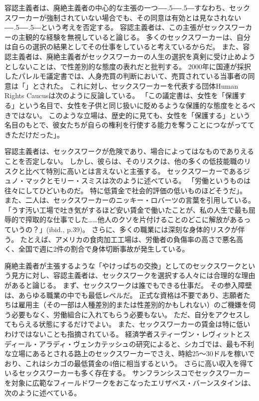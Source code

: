 \documentclass[paper=a4,book,openany]{jlreq}
\newcommand{\ig}[1]{}           %
\def\DDASH{―\kern-.5\zw―\kern-.5\zw―}
\begin{document}
容認主義者は、廃絶主義者の中心的な主張の一つ{\DDASH}すなわち、セックスワーカーが強制されていない場合でも、その同意は有効とは見なされない{\DDASH}という考えを否定する。
容認主義者は、この主張がセックスワーカーの主観的な経験を無視していると論じる。
多くのセックスワーカーは、自分は自らの選択の結果としてその仕事をしていると考えているからだ。
また、容認主義者は、廃絶主義者がセックスワーカーの人生の選択を真剣に受け止めようとしないことは、で性差別的な態度の表れだと批判する。
2000年に国連が採択したパレルモ議定書では、人身売買の判断において、売買されている当事者の同意は「」とされた。
これに対し、セックスワーカーを代表する団体Human Rights Caucusは次のように反論している。
「この議定書は、女性を「保護する」という名目で、女性を子供と同じ扱いに貶めるような保護的な態度をとるべきではない。
このような立場は、歴史的に見ても、女性を「保護する」という名目のもとで、彼女たちが自らの権利を行使する能力を奪うことにつながっててきただけだった」\citep{caucus99:_recom_commen_draft_protoc_combat}。

容認主義者は、セックスワークが危険であり、場合によってはなものでありえることを否定しない。
しかし、彼らは、そのリスクは、他の多くの低技能職のリスクと比べて特別に高いとは言えないと主張する。
セックスワーカーであるジュノ・マックとモリー・スミスは次のように述べている。
「労働というものは往々にしてひどいものだ。
特に低賃金で社会的評価の低いものほどそうだ」\citep[p.43]{mac18:_revol_prost}。
また、二人は、セックスワーカーのニッキー・ロバーツ\ig{Nickie Roberts}の言葉を引用している。
「うす汚い工場で吐き気がするほど安い賃金で働いたことが、私の人生で最も屈辱的で搾取的な仕事でした……他人のクソを片付けることのどこに解放があるっていうの？」(ibid., p.39)。
さらに、多くの職業には深刻な身体的リスクが伴う。
たとえば、アメリカの食肉加工工場は、労働者の負傷率の高さで悪名高く、全国で週に2件の割合で身体切断事故が発生している\citep{wasley18:_two_amput_week}。

廃絶主義者が主張するような「やけっぱちの交換」としてのセックスワークという見方に対し、容認主義者は、セックスワークを選択する人々には合理的な理由があると論じる。
まず、セックスワークは誰でもできる仕事だ。
その参入障壁は、あらゆる職業の中でも最低レベルだ。
正式な資格は不要であり、志願者たちは雇用主（その一部は人種差別的または性差別的かもしれない）のご機嫌を伺う必要もなく、労働組合に入れてもらう必要もない。
ただ、自分をアクセスしてもらえる状態にするだけでよい。
また、セックスワーカーの賃金は特に低いわけではないことも指摘されている。
経済学者スティーヴン・レヴィットとスディール・アラディ・ヴェンカテッシュの研究によると、シカゴでは、最も不利な立場にあるとされる路上のセックスワーカーでさえ、時給25～30ドルを稼いでおり、これはシカゴの最低賃金の4倍に相当するという\citep[p.26]{levitt07:_empir_analy_street_level_prost}。
さらに高い収入を得ているセックスワーカーも多く存在する。
サンフランシスコでセックスワーカーを対象に広範なフィールドワークをおこなったエリザベス・バーンスタインは、次のように述べている。
\end{document}
